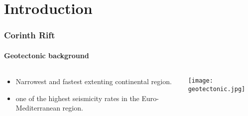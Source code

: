 \graphicspath{{Chapter1/Figs/}}

\section{Introduction}

\begin{frame}
  \frametitle{Corinth Rift}
  \framesubtitle{Geotectonic background}
  \label{}
  \begin{columns}[T]
    \begin{column}{.3\textwidth}
      \begin{itemize}\setlength\itemsep{.5em}
         \item Narrowest and fastest extenting continental region.
         \item one of the highest seismicity rates in the Euro-Mediterranean region.
       \end{itemize} 
    \end{column}
    \begin{column}{.6\textwidth}
      \begin{center}
        \texttt{[image: geotectonic.jpg]}
      \end{center}     
    \end{column}
  \end{columns}

  \begin{footnotesize}
    \citep{FernandezBlanco2019}
  \end{footnotesize}
  
\end{frame}
\note{}

\note{}

